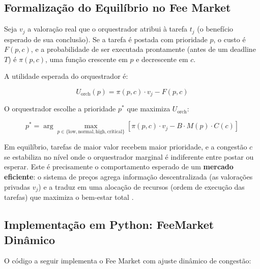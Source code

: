 \subsection{Formalização do Equilíbrio no Fee Market}

Seja $v_j$ a valoração real que o orquestrador atribui à tarefa $t_j$ (o benefício esperado de sua conclusão). Se a tarefa é postada com prioridade $p$, o custo é $F(p, c)$, e a probabilidade de ser executada prontamente (antes de um deadline $T$) é $\pi(p, c)$, uma função crescente em $p$ e decrescente em $c$.

A utilidade esperada do orquestrador é:

\begin{equation}\label{eq:orchestrator_utility}
U_{\text{orch}}(p) = \pi(p, c) \cdot v_j - F(p, c)
\end{equation}

O orquestrador escolhe a prioridade $p^*$ que maximiza $U_{\text{orch}}$:

\begin{equation}\label{eq:optimal_priority}
p^* = \arg\max_{p \in \{\text{low}, \text{normal}, \text{high}, \text{critical}\}} \left[\pi(p, c) \cdot v_j - B \cdot M(p) \cdot C(c)\right]
\end{equation}

Em equilíbrio, tarefas de maior valor recebem maior prioridade, e a congestão $c$ se estabiliza no nível onde o orquestrador marginal é indiferente entre postar ou esperar. Este é precisamente o comportamento esperado de um \textbf{mercado eficiente}: o sistema de preços agrega informação descentralizada (as valorações privadas $v_j$) e a traduz em uma alocação de recursos (ordem de execução das tarefas) que maximiza o bem-estar total \cite{hayek1945use}.

\subsection{Implementação em Python: FeeMarket Dinâmico}

O código a seguir implementa o Fee Market com ajuste dinâmico de congestão:

